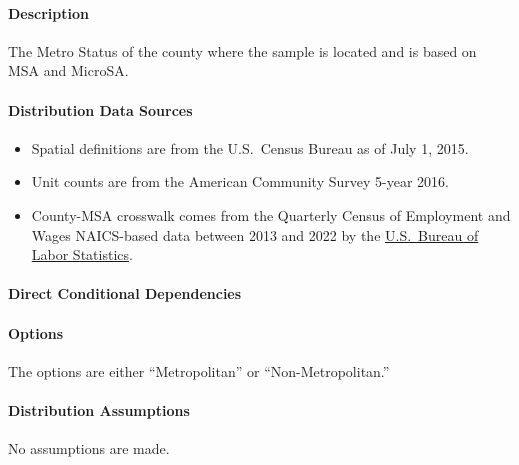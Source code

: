 \paragraph{Description}
% 
The Metro Status of the county where the sample is located and is based on MSA and MicroSA.

\paragraph{Distribution Data Sources}
% 
\begin{itemize}
    \item Spatial definitions are from the U.S.~Census Bureau as of July 1, 2015.
    \item Unit counts are from the American Community Survey 5-year 2016.
    \item County-MSA crosswalk comes from the Quarterly Census of Employment and Wages NAICS-based data between 2013 and 2022 by the  \href{https://www.bls.gov/cew/classifications/areas/county-msa-csa-crosswalk.htm}{U.S.~Bureau of Labor Statistics}.
\end{itemize}

\paragraph{Direct Conditional Dependencies}


\paragraph{Options}
The options are either ``Metropolitan'' or ``Non-Metropolitan.''

\paragraph{Distribution Assumptions}
% 
No assumptions are made.
